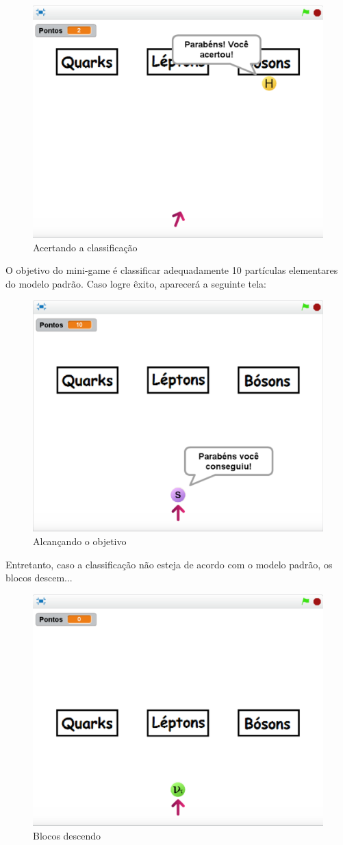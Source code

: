 \documentclass[12pt,fleqn]{book} %
\begin{document}
\begin{figure}[h]
	\centering
	\includegraphics[width=0.65 \textwidth]{Produto/class5}
	\caption{Acertando a classificação}
	\label{fig:app_a:class5}
\end{figure}


O objetivo do mini-game é classificar adequadamente 10 partículas elementares do modelo padrão. Caso logre êxito, aparecerá a seguinte tela:

\begin{figure}[h]
	\centering
	\includegraphics[width=0.63 \textwidth]{Produto/class10}
	\caption{Alcançando o objetivo}
	\label{fig:app_a:class10}
\end{figure}

\newpage

Entretanto, caso a classificação não esteja de acordo com o modelo padrão, os blocos descem...

\begin{figure}[h]
	\centering
	\includegraphics[width=0.65 \textwidth]{Produto/class4}
	\caption{Blocos descendo}
	\label{fig:app_a:class4}
\end{figure}
\end{document}
